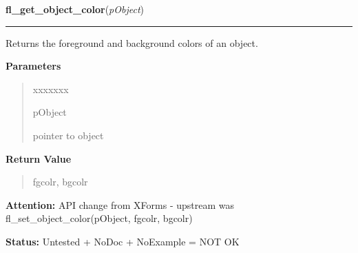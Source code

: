 \hspace{.8\funcindent}\begin{boxedminipage}{\funcwidth}

    \raggedright \textbf{fl\_get\_object\_color}(\textit{pObject})

    \vspace{-1.5ex}

    \rule{\textwidth}{0.5\fboxrule}
\setlength{\parskip}{2ex}
    Returns the foreground and background colors of an object.

\setlength{\parskip}{1ex}
      \textbf{Parameters}
      \vspace{-1ex}

      \begin{quote}
        \begin{Ventry}{xxxxxxx}

          \item[pObject]

          pointer to object

        \end{Ventry}

      \end{quote}

      \textbf{Return Value}
    \vspace{-1ex}

      \begin{quote}
      fgcolr, bgcolr

      \end{quote}

\textbf{Attention:} API change from XForms - upstream was fl\_set\_object\_color(pObject, 
fgcolr, bgcolr)



\textbf{Status:} Untested + NoDoc + NoExample = NOT OK



    \end{boxedminipage}

    \label{xformslib:library:fl_set_object_label}

    \vspace{0.5ex}

